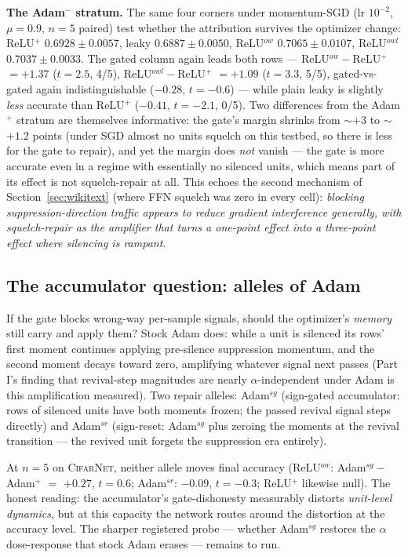 \documentclass[11pt]{article}
\newcommand{\modelCifarNet}{\textsc{CifarNet}\xspace}
\begin{document}
\textbf{The Adam$^{-}$ stratum.} The same four corners under
momentum-SGD (lr $10^{-2}$, $\mu{=}0.9$, $n{=}5$ paired) test
whether the attribution survives the optimizer change:
ReLU$^{+}$ $0.6928 \pm 0.0057$, leaky $0.6887 \pm 0.0050$,
ReLU$^{\mathit{ow}}$ $0.7065 \pm 0.0107$, ReLU$^{\mathit{owl}}$
$0.7037 \pm 0.0033$. The gated column again leads both rows ---
ReLU$^{\mathit{ow}}{-}$ReLU$^{+}$ $= +1.37$ ($t{=}2.5$, 4/5),
ReLU$^{\mathit{owl}}{-}$ReLU$^{+}$ $= +1.09$ ($t{=}3.3$, 5/5),
gated-vs-gated again indistinguishable ($-0.28$, $t{=}{-}0.6$) ---
while plain leaky is slightly \emph{less} accurate than ReLU$^{+}$
($-0.41$, $t{=}{-}2.1$, 0/5). Two differences from the Adam$^{+}$
stratum are themselves informative: the gate's margin shrinks from
$\sim$$+3$ to $\sim$$+1.2$ points (under SGD almost no units
squelch on this testbed, so there is less for the gate to repair),
and yet the margin does \emph{not} vanish --- the gate is more
accurate even in a regime with essentially no silenced units, which
means part of its effect is not squelch-repair at all. This echoes
the second mechanism of Section~\ref{sec:wikitext} (where FFN
squelch was zero in every cell): \emph{blocking
suppression-direction traffic appears to reduce gradient
interference generally, with squelch-repair as the amplifier that
turns a one-point effect into a three-point effect where silencing
is rampant.}

\subsection{The accumulator question: alleles of Adam}
\label{sec:adamalleles}

If the gate blocks wrong-way per-sample signals, should the
optimizer's \emph{memory} still carry and apply them? Stock Adam
does: while a unit is silenced its rows' first moment continues
applying pre-silence suppression momentum, and the second moment
decays toward zero, amplifying whatever signal next passes (Part I's
finding that revival-step magnitudes are nearly
$\alpha$-independent under Adam is this amplification measured).
Two repair alleles: Adam$^{\mathit{sg}}$ (sign-gated accumulator:
rows of silenced units have both moments frozen; the passed revival
signal steps directly) and Adam$^{\mathit{sr}}$ (sign-reset:
Adam$^{\mathit{sg}}$ plus zeroing the moments at the revival
transition --- the revived unit forgets the suppression era
entirely).

At $n{=}5$ on \modelCifarNet{}, neither allele moves final accuracy
(ReLU$^{\mathit{ow}}$: Adam$^{\mathit{sg}}{-}$Adam$^{+}$ $=$
$+0.27$, $t{=}0.6$; Adam$^{\mathit{sr}}$: $-0.09$, $t{=}{-}0.3$;
ReLU$^{+}$ likewise null). The honest reading: the accumulator's
gate-dishonesty measurably distorts \emph{unit-level dynamics}, but
at this capacity the network routes around the distortion at the
accuracy level. The sharper registered probe --- whether
Adam$^{\mathit{sg}}$ restores the $\alpha$ dose-response that stock
Adam erases --- remains to run.
\end{document}
